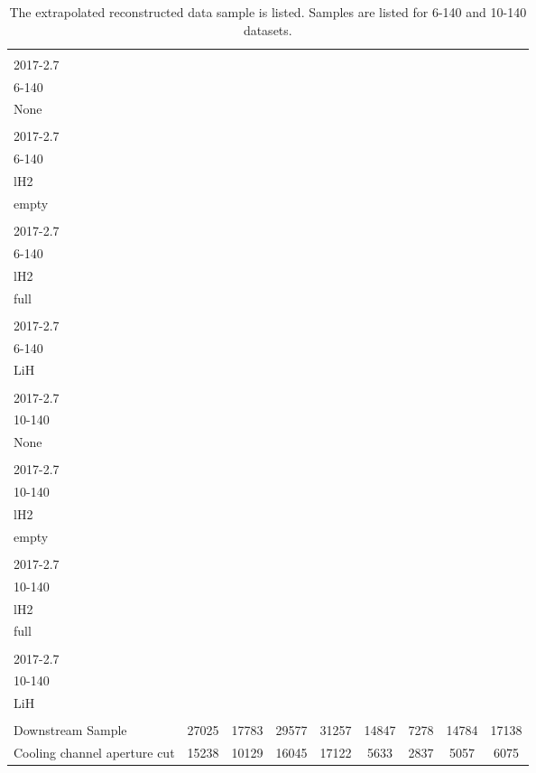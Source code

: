 \begin{table}
\centering
\caption{The extrapolated reconstructed data sample is listed.  Samples are listed for 6-140 and 10-140 datasets.\label{tab:data_cuts_summary_2_1}}
\begin{tabular}[pos]{l|cccccccc}
                                                   & \splitcell{\\2017-2.7\\6-140\\None\\} & \splitcell{\\2017-2.7\\6-140\\lH2\\empty\\} & \splitcell{\\2017-2.7\\6-140\\lH2\\full\\} & \splitcell{\\2017-2.7\\6-140\\LiH\\} & \splitcell{\\2017-2.7\\10-140\\None\\} & \splitcell{\\2017-2.7\\10-140\\lH2\\empty\\} & \splitcell{\\2017-2.7\\10-140\\lH2\\full\\} & \splitcell{\\2017-2.7\\10-140\\LiH\\} \\
\hline                                            
Downstream Sample                                  &   27025  &   17783  &   29577  &   31257  &   14847  &    7278  &   14784  &   17138  \\
\hline                                            
Cooling channel aperture cut                       &   15238  &   10129  &   16045  &   17122  &    5633  &    2837  &    5057  &    6075  \\

\end{tabular}
\end{table}
